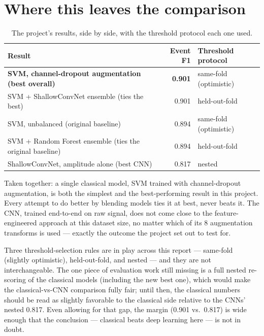 \section{Where this leaves the comparison}

\begin{table}[H]
  \centering
  \caption{The project's results, side by side, with the threshold protocol each one used.}
  \label{tab:final-comparison}
  \small
  \begin{tabular}{p{7.3cm}rl}
    \toprule
    Result & Event F1 & Threshold protocol \\
    \midrule
    \textbf{SVM, channel-dropout augmentation (best overall)} & \textbf{0.901} & same-fold (optimistic) \\
    SVM + ShallowConvNet ensemble (ties the best) & 0.901 & held-out-fold \\
    SVM, unbalanced (original baseline) & 0.894 & same-fold (optimistic) \\
    SVM + Random Forest ensemble (ties the original baseline) & 0.894 & held-out-fold \\
    ShallowConvNet, amplitude alone (best CNN) & 0.817 & nested \\
    \bottomrule
  \end{tabular}
\end{table}

Taken together: a single classical model, SVM trained with channel-dropout augmentation, is both
the simplest and the best-performing result in this project. Every attempt to do better by
blending models ties it at best, never beats it. The CNN, trained end-to-end on raw signal, does
not come close to the feature-engineered approach at this dataset size, no matter which of its 8
augmentation transforms is used --- exactly the outcome the project set out to test for.

\begin{summarybox}
Three threshold-selection rules are in play across this report --- same-fold (slightly
optimistic), held-out-fold, and nested --- and they are not interchangeable. The one piece of
evaluation work still missing is a full nested re-scoring of the classical models (including the
new best one), which would make the classical-vs-CNN comparison fully fair; until then, the
classical numbers should be read as slightly favorable to the classical side relative to the
CNNs' nested 0.817. Even allowing for that gap, the margin (0.901 vs.\ 0.817) is wide enough that
the conclusion --- classical beats deep learning here --- is not in doubt.
\end{summarybox}
